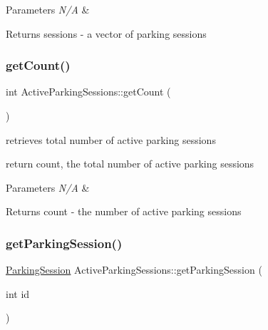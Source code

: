 \begin{DoxyParams}{Parameters}
{\em N/A} & \\
\hline
\end{DoxyParams}
\begin{DoxyReturn}{Returns}
sessions -\/ a vector of parking sessions 
\end{DoxyReturn}
\mbox{\label{class_active_parking_sessions_aae920aab19389cd3e772720bda66ca79}} 
\subsubsection{\texorpdfstring{get\+Count()}{getCount()}}
{\footnotesize\ttfamily int Active\+Parking\+Sessions\+::get\+Count (\begin{DoxyParamCaption}{ }\end{DoxyParamCaption})}



retrieves total number of active parking sessions 

return count, the total number of active parking sessions


\begin{DoxyParams}{Parameters}
{\em N/A} & \\
\hline
\end{DoxyParams}
\begin{DoxyReturn}{Returns}
count -\/ the number of active parking sessions 
\end{DoxyReturn}
\mbox{\label{class_active_parking_sessions_a0aa9e3c0239a4f8ce36b96056f73beaa}} 
\subsubsection{\texorpdfstring{get\+Parking\+Session()}{getParkingSession()}}
{\footnotesize\ttfamily \mbox{\hyperlink{class_parking_session}{Parking\+Session}} Active\+Parking\+Sessions\+::get\+Parking\+Session (\begin{DoxyParamCaption}\item[{int}]{id }\end{DoxyParamCaption})}



